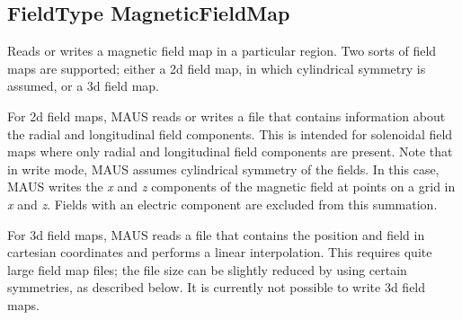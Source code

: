 \subsection{FieldType MagneticFieldMap}
Reads or writes a magnetic field map in a particular region. Two sorts of field maps are supported; either a 2d field
map, in which cylindrical symmetry is assumed, or a 3d field map. 

For 2d field maps, MAUS reads or writes a file that contains information about the radial and longitudinal field
components. This is intended for solenoidal field maps where only radial and longitudinal field components are present.
Note that in write mode, MAUS assumes cylindrical symmetry of the fields. In this case, MAUS writes the \textit{x}
and \textit{z} components of the magnetic field at points on a grid in \textit{x} and \textit{z}. Fields with an
electric component are excluded from this summation.

For 3d field maps, MAUS reads a file that contains the position and field in cartesian coordinates and performs a
linear interpolation. This requires quite large field map files; the file size can be slightly reduced by using certain
symmetries, as described below. It is currently not possible to write 3d field maps.

